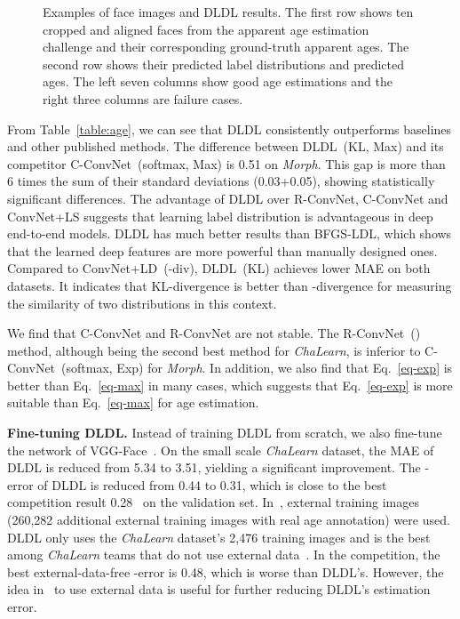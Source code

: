 \documentclass[journal]{IEEEtran}
\begin{document}
\begin{figure*}
    \quad \vrule \quad
 \caption{Examples of face images and DLDL results. The first row shows ten cropped and aligned faces from the apparent age estimation challenge and their corresponding ground-truth apparent ages. The second row shows their predicted label distributions and predicted ages. The left seven columns show good age estimations and the right three columns are failure cases.}\label{fig:eg-age}
\end{figure*}

From Table~\ref{table:age}, we can see that DLDL consistently outperforms baselines and other published methods. The difference between DLDL~(KL, Max) and its competitor C-ConvNet~(softmax, Max) is 0.51 on \emph{Morph}. This gap is more than 6 times the sum of their standard deviations (0.03+0.05), showing statistically significant differences. The advantage of DLDL over R-ConvNet, C-ConvNet and ConvNet+LS suggests that learning label distribution is advantageous in deep end-to-end models. DLDL has much better results than BFGS-LDL, which shows that the learned deep features are more powerful than manually designed ones. Compared to ConvNet+LD~(-div), DLDL~(KL) achieves lower MAE on both datasets. It indicates that KL-divergence is better than -divergence for measuring the similarity of two distributions in this context.


We find that C-ConvNet and R-ConvNet are not stable. The R-ConvNet~() method, although being the second best method for \emph{ChaLearn}, is inferior to C-ConvNet~(softmax, Exp) for \emph{Morph}. In addition, we also find that Eq.~\ref{eq-exp} is better than Eq.~\ref{eq-max} in many cases, which suggests that Eq.~\ref{eq-exp} is more suitable than Eq.~\ref{eq-max} for age estimation.

\textbf{Fine-tuning DLDL.} Instead of training DLDL from scratch, we also fine-tune the network of VGG-Face~\cite{Parkhi15}. On the small scale \emph{ChaLearn} dataset, the MAE of DLDL is reduced from 5.34 to 3.51, yielding a significant improvement. The -error of DLDL is reduced from 0.44 to 0.31, which is close to the best competition result 0.28~\cite{rothe2015dex} on the validation set. In~\cite{rothe2016deep}, external training images (260,282 additional external training images with real age annotation) were used. DLDL only uses the \emph{ChaLearn} dataset's 2,476 training images and is the best among \emph{ChaLearn} teams that do not use external data~\cite{escalera2015chalearn}. In the competition, the best external-data-free -error is 0.48, which is worse than DLDL's. However, the idea in~\cite{rothe2016deep} to use external data is useful for further reducing DLDL's estimation error.
\end{document}
